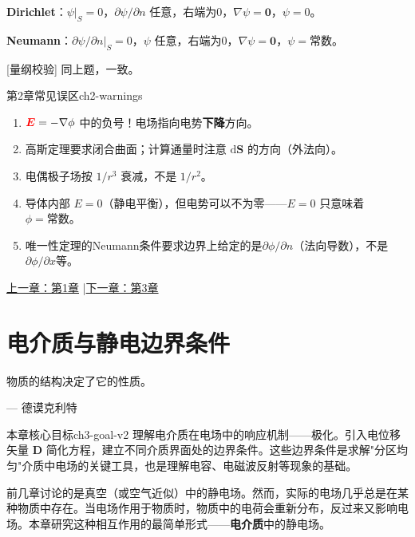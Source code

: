 \documentclass[11pt,a4paper,openany,oneside]{book}
\newcommand{\diff}{\mathrm{d}}
\newcommand{\vecE}{\textcolor{red}{\vect{E}}}
\newcommand{\vect}[1]{\bm{#1}}
\newcommand{\grad}{\nabla}
\begin{document}
\textbf{Dirichlet}：$\psi|_S = 0$，$\partial\psi/\partial n$ 任意，右端为0，$\grad\psi = \vect{0}$，$\psi = 0$。

\textbf{Neumann}：$\partial\psi/\partial n|_S = 0$，$\psi$ 任意，右端为0，$\grad\psi = \vect{0}$，$\psi = \text{常数}$。\qedsymbol

[量纲校验] 同上题，一致。\qedsymbol



\begin{warning}{第2章常见误区}{ch2-warnings}
\begin{enumerate}
\item $\vecE = -\grad\phi$ 中的负号！电场指向电势\textbf{下降}方向。
\item 高斯定理要求闭合曲面；计算通量时注意 $\diff\vect{S}$ 的方向（外法向）。
\item 电偶极子场按 $1/r^3$ 衰减，不是 $1/r^2$。
\item 导体内部 $E=0$（静电平衡），但电势可以不为零——$E=0$ 只意味着 $\phi = \text{常数}$。
\item 唯一性定理的Neumann条件要求边界上给定的是$\partial\phi/\partial n$（法向导数），不是$\partial\phi/\partial x$等。
\end{enumerate}
\end{warning}



\begin{center}\small \hyperlink{ch1-goal}{上一章：第1章} \quad|\quad \hyperlink{ch3-goal}{下一章：第3章}\end{center}

\chapter{电介质与静电边界条件}
\epigraph{物质的结构决定了它的性质。}{--- 德谟克利特}

\hypertarget{ch3-goal}{}\begin{insight}{本章核心目标}{ch3-goal-v2}
理解电介质在电场中的响应机制——极化。引入电位移矢量 $\vect{D}$ 简化方程，建立不同介质界面处的边界条件。这些边界条件是求解"分区均匀"介质中电场的关键工具，也是理解电容、电磁波反射等现象的基础。
\end{insight}

前几章讨论的是真空（或空气近似）中的静电场。然而，实际的电场几乎总是在某种物质中存在。当电场作用于物质时，物质中的电荷会重新分布，反过来又影响电场。本章研究这种相互作用的最简单形式——\textbf{电介质}中的静电场。
\end{document}
